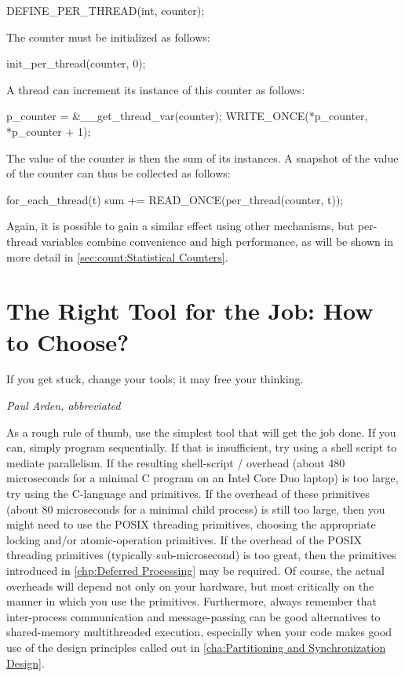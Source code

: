 \begin{VerbatimU}
DEFINE_PER_THREAD(int, counter);
\end{VerbatimU}

The counter must be initialized as follows:

\begin{VerbatimU}
init_per_thread(counter, 0);
\end{VerbatimU}

A thread can increment its instance of this counter as follows:

\begin{VerbatimU}
p_counter = &__get_thread_var(counter);
WRITE_ONCE(*p_counter, *p_counter + 1);
\end{VerbatimU}

The value of the counter is then the sum of its instances.
A snapshot of the value of the counter can thus be collected
as follows:

\begin{VerbatimU}
for_each_thread(t)
  sum += READ_ONCE(per_thread(counter, t));
\end{VerbatimU}

Again, it is possible to gain a similar effect using other mechanisms,
but per-thread variables combine convenience and high performance,
as will be shown in more detail in
\cref{sec:count:Statistical Counters}.

\section{The Right Tool for the Job:
					How to Choose?}
\label{sec:toolsoftrade:The Right Tool for the Job: How to Choose?}
%
\epigraph{If you get stuck, change your tools; it may free your thinking.}
	 {\emph{Paul Arden, abbreviated}}

As a rough rule of thumb, use the simplest tool that will get the job done.
If you can, simply program sequentially.
If that is insufficient, try using a shell script to mediate parallelism.
If the resulting shell-script / overhead
(about 480 microseconds for a minimal C program on an Intel Core Duo
laptop) is too
large, try using the C-language  and  primitives.
If the overhead of these primitives (about 80 microseconds for a minimal
child process) is still too large, then you
might need to use the POSIX threading primitives, choosing the appropriate
locking and/or atomic-operation primitives.
If the overhead of the POSIX threading primitives (typically sub-microsecond)
is too great, then the primitives introduced in
\cref{chp:Deferred Processing} may be required.
Of course, the actual overheads will depend not only on your hardware,
but most critically on the manner in which you use the primitives.
Furthermore, always remember that inter-process communication and
message-passing can be good alternatives to shared-memory multithreaded
execution, especially when your code makes good use of the design
principles called out in
\cref{cha:Partitioning and Synchronization Design}.

